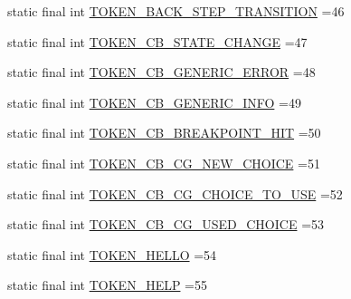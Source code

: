\begin{DoxyCompactItemize}
\item 
static final int \hyperlink{classgov_1_1nasa_1_1jpf_1_1inspector_1_1client_1_1parser_1_1_console_grammar_parser_a92588b71397a4a48b5b75155f6246a75}{T\+O\+K\+E\+N\+\_\+\+B\+A\+C\+K\+\_\+\+S\+T\+E\+P\+\_\+\+T\+R\+A\+N\+S\+I\+T\+I\+ON} =46
\item 
static final int \hyperlink{classgov_1_1nasa_1_1jpf_1_1inspector_1_1client_1_1parser_1_1_console_grammar_parser_a1593d2143dd48d46c80826136b940538}{T\+O\+K\+E\+N\+\_\+\+C\+B\+\_\+\+S\+T\+A\+T\+E\+\_\+\+C\+H\+A\+N\+GE} =47
\item 
static final int \hyperlink{classgov_1_1nasa_1_1jpf_1_1inspector_1_1client_1_1parser_1_1_console_grammar_parser_a6be8ebfb730371c4435b1b33e257fb3b}{T\+O\+K\+E\+N\+\_\+\+C\+B\+\_\+\+G\+E\+N\+E\+R\+I\+C\+\_\+\+E\+R\+R\+OR} =48
\item 
static final int \hyperlink{classgov_1_1nasa_1_1jpf_1_1inspector_1_1client_1_1parser_1_1_console_grammar_parser_ac2864ce68a47e8fefc6f2e66e1f0af5e}{T\+O\+K\+E\+N\+\_\+\+C\+B\+\_\+\+G\+E\+N\+E\+R\+I\+C\+\_\+\+I\+N\+FO} =49
\item 
static final int \hyperlink{classgov_1_1nasa_1_1jpf_1_1inspector_1_1client_1_1parser_1_1_console_grammar_parser_a7e8632d59cca2eb259cbb68a977634ed}{T\+O\+K\+E\+N\+\_\+\+C\+B\+\_\+\+B\+R\+E\+A\+K\+P\+O\+I\+N\+T\+\_\+\+H\+IT} =50
\item 
static final int \hyperlink{classgov_1_1nasa_1_1jpf_1_1inspector_1_1client_1_1parser_1_1_console_grammar_parser_a94b196d0e6cf1228268a2e715e79bad7}{T\+O\+K\+E\+N\+\_\+\+C\+B\+\_\+\+C\+G\+\_\+\+N\+E\+W\+\_\+\+C\+H\+O\+I\+CE} =51
\item 
static final int \hyperlink{classgov_1_1nasa_1_1jpf_1_1inspector_1_1client_1_1parser_1_1_console_grammar_parser_ac1184502e08afcb6108e6a6e94b39ae6}{T\+O\+K\+E\+N\+\_\+\+C\+B\+\_\+\+C\+G\+\_\+\+C\+H\+O\+I\+C\+E\+\_\+\+T\+O\+\_\+\+U\+SE} =52
\item 
static final int \hyperlink{classgov_1_1nasa_1_1jpf_1_1inspector_1_1client_1_1parser_1_1_console_grammar_parser_a8edea4613d4c563c2f219e1d695e32f6}{T\+O\+K\+E\+N\+\_\+\+C\+B\+\_\+\+C\+G\+\_\+\+U\+S\+E\+D\+\_\+\+C\+H\+O\+I\+CE} =53
\item 
static final int \hyperlink{classgov_1_1nasa_1_1jpf_1_1inspector_1_1client_1_1parser_1_1_console_grammar_parser_a02654226879b17f8ee3fc4508bacb0e0}{T\+O\+K\+E\+N\+\_\+\+H\+E\+L\+LO} =54
\item 
static final int \hyperlink{classgov_1_1nasa_1_1jpf_1_1inspector_1_1client_1_1parser_1_1_console_grammar_parser_a8acc93fe5d687353ad83d5b6b7af39dd}{T\+O\+K\+E\+N\+\_\+\+H\+E\+LP} =55

\end{DoxyCompactItemize}
